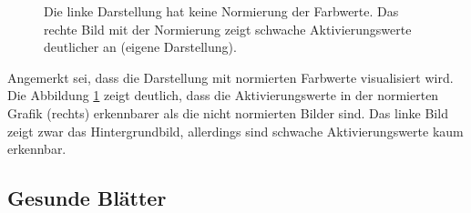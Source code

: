\begin{figure}[h!]
	\hfill
	\hfill
	\hfill
	\caption{Die linke Darstellung hat keine Normierung der Farbwerte. Das rechte Bild mit der Normierung zeigt schwache Aktivierungswerte deutlicher an (eigene Darstellung).
	}
	\label{vis_normalised_rgb}
\end{figure}


Angemerkt sei, dass die Darstellung mit normierten Farbwerte visualisiert wird. Die Abbildung \ref{vis_normalised_rgb} zeigt deutlich, dass die Aktivierungswerte in der normierten Grafik (rechts) erkennbarer als die nicht normierten Bilder sind. Das linke Bild zeigt zwar das Hintergrundbild, allerdings sind schwache Aktivierungswerte kaum erkennbar.

\subsection{Gesunde Blätter}


